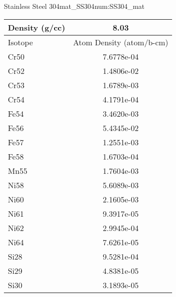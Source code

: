 \begin{matitem}{Stainless Steel 304}{mat_SS304}{num:SS304_mat}
  \centering
  \begin{tabular}{l c}
    \toprule
    Density (g/cc) & 8.03 \\
    \midrule
    Isotope & Atom Density (atom/b-cm) \\
    \midrule
    \midrule
Cr50 & 7.6778e-04 \\
Cr52 & 1.4806e-02 \\
Cr53 & 1.6789e-03 \\
Cr54 & 4.1791e-04 \\
Fe54 & 3.4620e-03 \\
Fe56 & 5.4345e-02 \\
Fe57 & 1.2551e-03 \\
Fe58 & 1.6703e-04 \\
Mn55 & 1.7604e-03 \\
Ni58 & 5.6089e-03 \\
Ni60 & 2.1605e-03 \\
Ni61 & 9.3917e-05 \\
Ni62 & 2.9945e-04 \\
Ni64 & 7.6261e-05 \\
Si28 & 9.5281e-04 \\
Si29 & 4.8381e-05 \\
Si30 & 3.1893e-05 \\

    \bottomrule
  \end{tabular}
\end{matitem}
